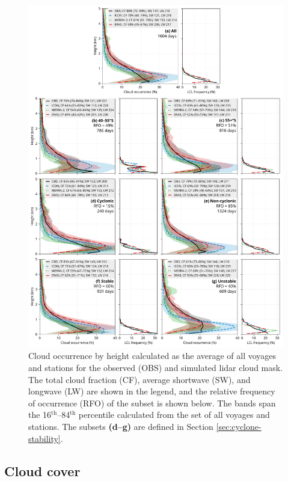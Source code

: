 \documentclass[12pt,a4paper]{article}
\begin{document}
\begin{figure}[p!]
\centering
\includegraphics[width=\textwidth]{img/cl_agg.pdf}
\caption{
Cloud occurrence by height calculated as the average of all voyages and
stations for the observed (OBS) and simulated lidar cloud mask. The total cloud
fraction (CF), average shortwave (SW), and longwave (LW) are shown in the
legend, and the relative frequency of occurrence (RFO) of the subset is shown
below.  The bands span the 16$^\mathrm{th}$--84$^\mathrm{th}$ percentile
calculated from the set of all voyages and stations. The subsets
\textbf{(d--g)} are defined in Section \ref{sec:cyclone-stability}.
}
\label{fig:cloud-occurrence}
\end{figure}

\subsection{Cloud cover}
\label{sec:cloud-cover}
\end{document}
